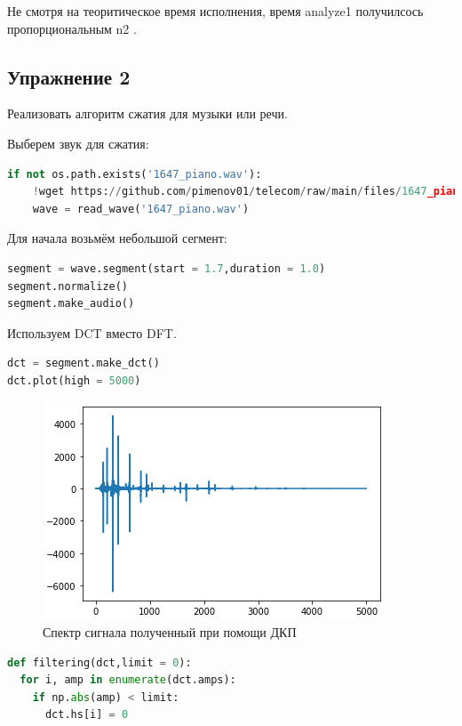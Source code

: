Не смотря на теоритическое время исполнения, время analyze1 получилсось пропорциональным  n2 .

\subsection{Упражнение 2}

Реализовать алгоритм сжатия для музыки или речи.

Выберем звук для сжатия:
\begin{lstlisting}[language=Python]
if not os.path.exists('1647_piano.wav'):
    !wget https://github.com/pimenov01/telecom/raw/main/files/1647_piano.wav
    wave = read_wave('1647_piano.wav')
\end{lstlisting}

Для начала возьмём небольшой сегмент:

\begin{lstlisting}[language=Python]
segment = wave.segment(start = 1.7,duration = 1.0)
segment.normalize()
segment.make_audio()
\end{lstlisting}

Используем DCT вместо DFT.

\begin{lstlisting}[language=Python]
dct = segment.make_dct()
dct.plot(high = 5000)
\end{lstlisting}
\begin{figure}[H]
	\begin{center}
		\includegraphics[scale=1]{fig/lab06/lab6_2.png}
		\caption{Спектр сигнала полученный при помощи ДКП}
	\end{center}
\end{figure}

\begin{lstlisting}[language=Python]
def filtering(dct,limit = 0):
  for i, amp in enumerate(dct.amps):
    if np.abs(amp) < limit:
      dct.hs[i] = 0
\end{lstlisting}

